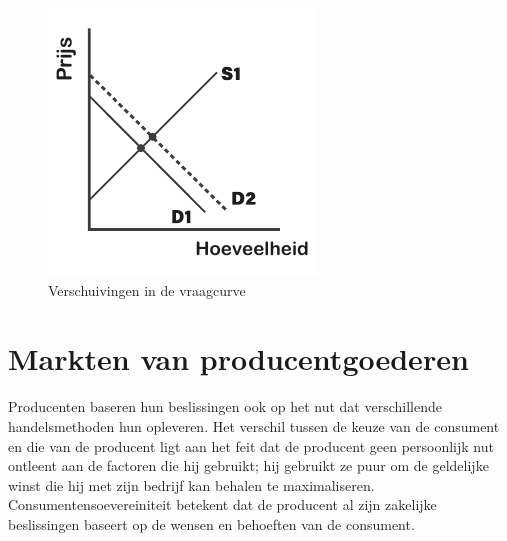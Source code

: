 \begin{figure}[h]
\centering
    \includegraphics[]{figures/fig28.pdf}
    \caption[Verschuivingen in de vraagcurve]{Verschuivingen in de vraagcurve}
    \label{fig28}
\end{figure}

\hypertarget{markten-van-producentgoederen}{%
\section{Markten van producentgoederen}\label{markten-van-producentgoederen}}

Producenten baseren hun beslissingen ook op het nut dat verschillende handelsmethoden hun opleveren. Het verschil tussen de keuze van de consument en die van de producent ligt aan het feit dat de producent geen persoonlijk nut ontleent aan de factoren die hij gebruikt; hij gebruikt ze puur om de geldelijke winst die hij met zijn bedrijf kan behalen te maximaliseren. Consumentensoevereiniteit betekent dat de producent al zijn zakelijke beslissingen baseert op de wensen en behoeften van de consument.

